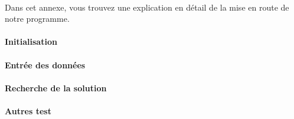 \documentclass[fleqn,10pt,french]{SelfArx} %
\begin{document}

~\\\indent
Dans cet annexe, vous trouvez une explication en détail de la mise en route de notre programme.

\paragraph{Initialisation}

\paragraph{Entrée des données}

\paragraph{Recherche de la solution}

\paragraph{Autres test}
\end{document}
